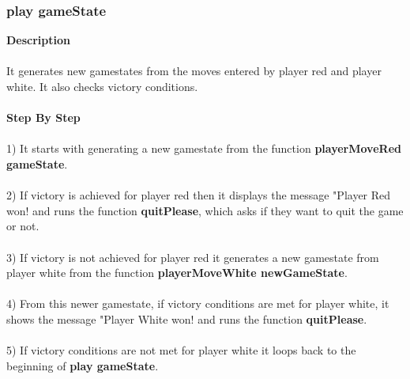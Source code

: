 \documentclass[12pt,a4paper]{article}
\begin{document}
{\subsubsection{play gameState}}
\textbf{Description}\\\\
It generates new gamestates from
the moves entered by player red and player white. It also checks victory conditions.\\\\
\textbf{Step By Step}
\\\\
1) It starts with generating a new gamestate
from the function {\textbf{\small{playerMoveRed gameState}}}.\\\\
2) If victory is achieved for player red
then it displays the message "Player Red won! and runs the function {\textbf{\small{quitPlease}}}, which asks if they want to quit the game or not.\\\\
3) If victory is not achieved for player red it generates a new gamestate from player white from the function {\textbf{\small{playerMoveWhite newGameState}}}.\\\\
4) From this newer gamestate, if victory conditions are met for player white, it shows
the message "Player White won! and runs the function {\textbf{\small{quitPlease}}}.\\\\
5) If victory conditions are not met for player white it loops back to the beginning of {\textbf{\small{play gameState}}}.\\\\
\end{document}
